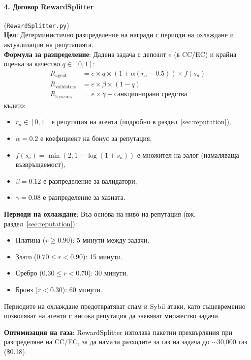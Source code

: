 \documentclass[11pt]{article}
\begin{document}
\paragraph{4. Договор RewardSplitter} (\texttt{RewardSplitter.py})\\
\textbf{Цел}: Детерминистично разпределение на награди с периоди на охлаждане и актуализации на репутацията.\\
\textbf{Формула за разпределение}: Дадена задача с депозит $e$ (в CC/EC) и крайна оценка за качество $q \in [0,1]$:
\begin{align}
R_{\text{agent}} &= e \times q \times \left(1 + \alpha (r_a - 0.5)\right) \times f(s_a) \label{eq:reward-agent} \\
R_{\text{validators}} &= e \times \beta \times (1-q) \label{eq:reward-validators} \\
R_{\text{treasury}} &= e \times \gamma + \text{санкционирани средства} \label{eq:reward-treasury}
\end{align}
където:
\begin{itemize}[noitemsep]
  \item $r_a \in [0,1]$ е репутация на агента (подробно в раздел~\ref{sec:reputation}),
  \item $\alpha = 0.2$ е коефициент на бонус за репутация,
  \item $f(s_a) = \min(2, 1 + \log(1+s_a))$ е множител на залог (намаляваща възвръщаемост),
  \item $\beta = 0.12$ е разпределение за валидатори,
  \item $\gamma = 0.08$ е разпределение за хазната.
\end{itemize}
\textbf{Периоди на охлаждане}: Въз основа на ниво на репутация (вж. раздел~\ref{sec:reputation}):
\begin{itemize}[noitemsep]
  \item Платина ($r \geq 0.90$): 5 минути между задачи.
  \item Злато ($0.70 \leq r < 0.90$): 15 минути.
  \item Сребро ($0.30 \leq r < 0.70$): 30 минути.
  \item Бронз ($r < 0.30$): 60 минути.
\end{itemize}
Периодите на охлаждане предотвратяват спам и Sybil атаки, като същевременно позволяват на агенти с висока репутация да заявяват множество задачи.

\textbf{Оптимизация на газа}: RewardSplitter използва пакетни прехвърляния при разпределяне на CC/EC, за да намали разходите за газ на задача до $\sim$30,000 газ (\$0.18).
\end{document}
